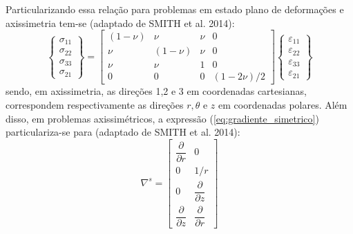Particularizando essa relação para problemas em estado plano de deformações e axissimetria tem-se (adaptado de SMITH et al. 2014):
\begin{equation}
	\label{eq:Dl}
	\left\{\begin{array}{lcl}
		\sigma_{11} \\
		\sigma_{22} \\
		\sigma_{33} \\
		\sigma_{21}
	\end{array}\right\} = 
	\begin{bmatrix}
		(1-\nu)	& \nu 		& \nu  		& 0	 		\\
		\nu 	& (1-\nu)	& \nu  		& 0		 	\\
		\nu 	& \nu 		& 1   		& 0		 	\\
		0		& 0			& 0		    & (1-2\nu)/2 
	\end{bmatrix}
	\left\{\begin{array}{lcl}
		\varepsilon_{11} \\
		\varepsilon_{22} \\
		\varepsilon_{33} \\
		\varepsilon_{21}
	\end{array}\right\}
\end{equation}
sendo, em axissimetria, as direções 1,2 e 3 em coordenadas cartesianas, correspondem respectivamente as direções $r, \theta$ e $z$ em coordenadas polares. Além disso, em problemas axissimétricos, a expressão (\ref{eq:gradiente_simetrico}) particulariza-se para (adaptado de SMITH et al. 2014):
\begin{equation}
	\label{eq:gradiente_simetrico_AXI_EPD}
	\nabla^s = 	\begin{bmatrix}
		\dfrac{\partial}{\partial r} & 0  \\
		0 & 1/r  \\
		0 & \dfrac{\partial}{\partial z} \\
		\dfrac{\partial}{\partial z} & \dfrac{\partial}{\partial r}	
	\end{bmatrix}
\end{equation}

